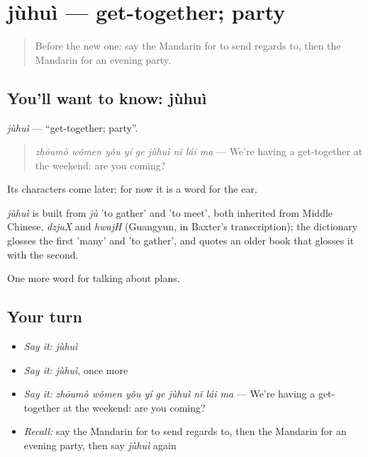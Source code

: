 \section[jùhuì]{jùhuì — get-together; party}

\label{lesson:ZH-C173-juhui}



\begin{quote}
Before the new one: say the Mandarin for to send regards to, then the Mandarin for an evening party.
\end{quote}

\subsection*{You'll want to know: jùhuì}
\emph{jùhuì} — \textquotedblleft{}get-together; party\textquotedblright{}.

\begin{quote}
\emph{zhōumò wǒmen yǒu yí ge jùhuì nǐ lái ma} — We're having a get-together at the weekend: are you coming?
\end{quote}

Its characters come later; for now it is a word for the ear.

\begin{cousinweb}
\emph{jùhuì} is built from \emph{jù} 'to gather' and  'to meet', both inherited from Middle Chinese, \emph{dzjuX} and \emph{hwajH} (Guangyun, in Baxter's transcription); the dictionary glosses the first 'many' and 'to gather', and quotes an older book that glosses it with the second.
\end{cousinweb}

\begin{grammarlens}[title={What you've built}]
One more word for talking about plans.
\end{grammarlens}

\subsection*{Your turn}
\begin{itemize}
\raggedright
  \item \emph{Say it:} \emph{jùhuì}
  \item \emph{Say it:} \emph{jùhuì}, once more
  \item \emph{Say it:} \emph{zhōumò wǒmen yǒu yí ge jùhuì nǐ lái ma} — We're having a get-together at the weekend: are you coming?
  \item \emph{Recall:} say the Mandarin for to send regards to, then the Mandarin for an evening party, then say \emph{jùhuì} again
\end{itemize}

